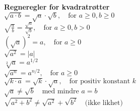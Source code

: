 \documentclass[a4paper,7pt,fleqn]{article}
\begin{document}
\begin{multicols}{3}
\begin{minipage}{\linewidth}
    \textbf{Regneregler for kvadratrøtter} \\
    \(\sqrt{a \cdot b} = \sqrt{a} \cdot \sqrt{b}, \quad \text{for } a \geq 0, b \geq 0\) \\
    \(\sqrt{\frac{a}{b}} = \frac{\sqrt{a}}{\sqrt{b}}, \quad \text{for } a \geq 0, b > 0\) \\
    \((\sqrt{a})^2 = a, \quad \text{for } a \geq 0\) \\
    \(\sqrt{a^2} = |a|\) \\
    \(\sqrt[2]{a} = a^{1/2}\) \\
    \(\sqrt{a^n} = a^{n/2}, \quad \text{for } a \geq 0\) \\
    \(\sqrt{k \cdot a} = \sqrt{k} \cdot \sqrt{a}, \quad \text{for positiv konstant } k\) \\
    \(\sqrt{a} \neq \sqrt{b} \quad \text{med mindre } a = b\) \\
    \(\sqrt{a^2 + b^2} \neq \sqrt{a^2} + \sqrt{b^2} \quad \text{(ikke likhet)}\)
\end{minipage}


\end{multicols}
\end{document}
